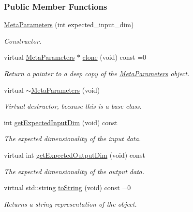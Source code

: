 \subsubsection*{Public Member Functions}
\begin{DoxyCompactItemize}
\item 
\hyperlink{classDmpBbo_1_1MetaParameters_af32e475115f403f9e1f3198ae9f4157b}{Meta\+Parameters} (int expected\+\_\+input\+\_\+dim)
\begin{DoxyCompactList}\small\item\em Constructor. \end{DoxyCompactList}\item 
virtual \hyperlink{classDmpBbo_1_1MetaParameters}{Meta\+Parameters} $\ast$ \hyperlink{classDmpBbo_1_1MetaParameters_a93ea31a71a0956a7031f060b2d439641}{clone} (void) const =0
\begin{DoxyCompactList}\small\item\em Return a pointer to a deep copy of the \hyperlink{classDmpBbo_1_1MetaParameters}{Meta\+Parameters} object. \end{DoxyCompactList}\item 
\hypertarget{classDmpBbo_1_1MetaParameters_a2f84c9b9e43e6d0618129745c9c7fff5}{virtual \hyperlink{classDmpBbo_1_1MetaParameters_a2f84c9b9e43e6d0618129745c9c7fff5}{$\sim$\+Meta\+Parameters} (void)}\label{classDmpBbo_1_1MetaParameters_a2f84c9b9e43e6d0618129745c9c7fff5}

\begin{DoxyCompactList}\small\item\em Virtual destructor, because this is a base class. \end{DoxyCompactList}\item 
int \hyperlink{classDmpBbo_1_1MetaParameters_af5a550bcf65d5a29a153a594cc4e3fa1}{get\+Expected\+Input\+Dim} (void) const 
\begin{DoxyCompactList}\small\item\em The expected dimensionality of the input data. \end{DoxyCompactList}\item 
virtual int \hyperlink{classDmpBbo_1_1MetaParameters_ab1a7cb7c0bf6fe5afd5561fa6f27ba7b}{get\+Expected\+Output\+Dim} (void) const 
\begin{DoxyCompactList}\small\item\em The expected dimensionality of the output data. \end{DoxyCompactList}\item 
virtual std\+::string \hyperlink{classDmpBbo_1_1MetaParameters_af084bff2ddd6233e9a898faa23f6195c}{to\+String} (void) const =0
\begin{DoxyCompactList}\small\item\em Returns a string representation of the object. \end{DoxyCompactList}\end{DoxyCompactItemize}
